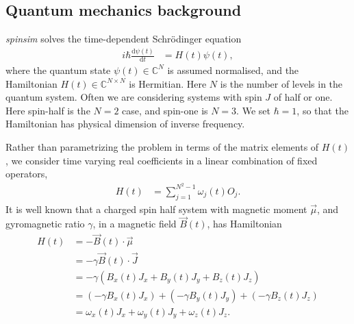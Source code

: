 \documentclass{jors}
\begin{document}
	\subsection{Quantum mechanics background}
		\emph{spinsim} solves the time-dependent Schr\"{o}dinger equation
		\begin{align}
			i\hbar\frac{\mathrm{d}\psi(t)}{\mathrm{d}t} &= H(t)\psi(t),\label{eq:schroedinger}
		\end{align}
		where the quantum state \(\psi(t) \in \mathbb{C}^N\) is assumed normalised, and the Hamiltonian \(H(t) \in \mathbb{C}^{N \times N}\) is Hermitian.
		Here \(N\) is the number of levels in the quantum system.
		Often we are considering systems with spin \(J\) of half or one.
		Here spin-half is the \(N = 2\) case, and spin-one is \(N = 3\).
		We set \(\hbar = 1\), so that the Hamiltonian has physical dimension of inverse frequency.
		
		

		Rather than parametrizing the problem in terms of the matrix elements of \(H(t)\), we consider time varying real coefficients in a linear combination of fixed operators,
		\begin{align}
			H(t) &= \sum_{j = 1}^{N^2 - 1} \omega_j(t) O_j.
		\end{align}
		It is well known that a charged spin half system with magnetic moment \(\overrightarrow{\mu}\), and gyromagnetic ratio \(\gamma\), in a magnetic field \(\overrightarrow{B}(t)\), has Hamiltonian
		\begin{align}
			H(t) &= -\overrightarrow{B}(t)\cdot \overrightarrow{\mu}\\
			&= -\gamma \overrightarrow{B}(t)\cdot \overrightarrow{J}\\
			&= -\gamma \left(B_x(t) J_x + B_y(t) J_y + B_z(t) J_z\right)\\
			&= \left(-\gamma B_x(t) J_x\right) + \left(-\gamma B_y(t) J_y\right) + \left(-\gamma B_z(t) J_z\right)\\
			&= \omega_x(t) J_x + \omega_y(t) J_y + \omega_z(t) J_z.
		\end{align}
\end{document}
